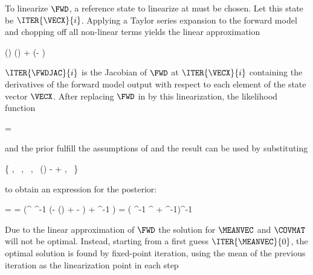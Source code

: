 \startsubsection[title=Iterative Solutions]

    To linearize $\FWD$, a reference state to linearize at must be chosen.
    Let this state be $\ITER{\VECX}{i}$. Applying a Taylor series
    expansion to the forward model and chopping off all non-linear
    terms yields the linear approximation

    \startformula
        \FWD(\VECX) \approx \FWD()
            +  (\VECX - ) \EQSTOP
    \stopformula

    $\ITER{\FWDJAC}{i}$ is the Jacobian of $\FWD$ at $\ITER{\VECX}{i}$
    containing the derivatives of the forward model output with respect to each
    element of the state vector $\VECX$. After replacing $\FWD$ in
     by this linearization, the likelihood function

    \startformula
        \LIKELIHOOD = 
    \stopformula

    and the prior  fulfill the assumptions of
     and the result  can be used by
    substituting

    \startformula
        \{ \VECA \rightarrow \MEANVECA,~
        \MATPI \rightarrow \COVMATA,~
        \MATB \rightarrow {},~
        \VECB \rightarrow \FWD()
            -  
            + \MEANVECERR,~
        \MATQI \rightarrow \COVMATERR \}
    \stopformula

    to obtain an expression for the posterior:
    
    \startformula
    \startalign[n=2,align={right,left}]
        \NC \POSTERIOR = \NC \GAUSS{\VECX}{\MEANVEC}{\COVMAT} \EQCOMMA \NR
        \NC \MEANVEC = \NC \COVMAT (^\top
            \COVMATERR^{-1} (\VECY - \FWD()
            +   - \MEANVECERR)
            + \COVMATA^{-1} \MEANVECA) \EQCOMMA \NR
        \NC \COVMAT = \NC 
            ( \COVMATERR^{-1} ^\top
            + \COVMATA^{-1})^{-1} \EQSTOP \NR
    \stopalign
    \stopformula
    
    Due to the linear approximation of $\FWD$ the solution for $\MEANVEC$ and
    $\COVMAT$ will not be optimal. Instead, starting from a first guess
    $\ITER{\MEANVEC}{0}$, the optimal solution is found by fixed-point
    iteration, using the mean of the previous iteration as the linearization
    point in each step

